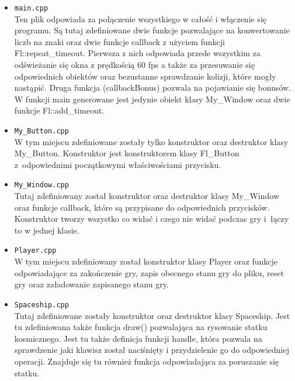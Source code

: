 \documentclass{article}
\begin{document}
\begin{normalsize}
\begin{enumerate}
\begin{itemize}
				\item \verb;main.cpp;\\
					Ten plik odpowiada za połączenie wszystkiego w całość i włączenie się programu. Są tutaj  zdefiniowane dwie funkcje pozwalające na konwertowanie liczb na znaki oraz dwie funkcje callback z użyciem funkcji Fl::repeat\_timeout. Pierwsza z nich odpowiada przede wszystkim za odświeżanie się okna z prędkością 60 fps a także za przesuwanie się odpowiednich obiektów oraz bezustanne sprawdzanie kolizji, które mogły nastąpić. Druga funkcja (callbackBonus) pozwala na pojawianie się bonusów. W funkcji main generowane jest jedynie obiekt klasy My\_Window oraz dwie funkcje Fl::add\_timeout.
				\item \verb;My_Button.cpp;\\
					W tym miejscu zdefiniowane zostały tylko konstruktor oraz destruktor klasy My\_Button. Konstruktor jest konstruktorem klasy Fl\_Button z~odpowiednimi początkowymi właściwościami przycisku.
				\item \verb;My_Window.cpp;\\
					Tutaj zdefiniowany został konstruktor oraz destruktor klasy My\_Window oraz funkcje callback, które są przypisane do odpowiednich przycisków. Konstruktor tworzy wszystko co widać i czego nie widać podczas gry i~łączy to w jednej klasie.
				\item \verb;Player.cpp;\\
					W tym miejscu zdefiniowany został konstruktor klasy Player oraz funkcje odpowiadające za zakończenie gry, zapis obecnego stanu gry do pliku, reset gry oraz załadowanie zapisanego stanu gry.
				\item \verb;Spaceship.cpp;\\
					Tutaj zdefiniowane zostały konstruktor oraz destruktor klasy Spaceship. Jest tu zdefiniowana także funkcja draw() pozwalająca na rysowanie statku kosmicznego. Jest tu także definicja funkcji handle, która pozwala na sprawdzenie jaki klawisz został naciśnięty i przydzielenie go do odpowiedniej operacji. Znajduje się tu również funkcja odpowiadająca za poruszanie się statku.
			\end{itemize}
	\end{enumerate}
\end{normalsize}
\end{document}
